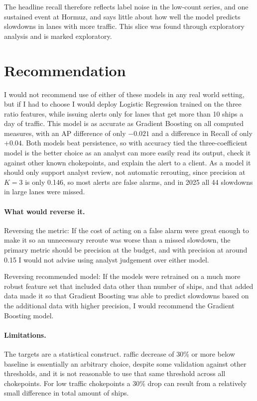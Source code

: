 \documentclass[11pt]{article}
\begin{document}
The headline recall therefore reflects label noise in the low-count series, and one sustained event at Hormuz, and says little about how well the model predicts slowdowns in lanes with more traffic. This slice was found through exploratory analysis and is marked exploratory. 
\section{Recommendation}  %
I would not recommend use of either of these models in any real world setting, but if I had to choose I would deploy Logistic Regression trained on the three ratio features, while issuing alerts only for lanes that get more than 10 ships a day of traffic. This model is as accurate as Gradient Boosting on all computed measures, with an AP difference of only $-0.021$ and a difference in Recall of only $+0.04$. Both models beat persistence, so with accuracy tied the three-coefficient model is the better choice as an analyst can more easily read its output, check it against other known chokepoints, and explain the alert to a client. As a model it should only support analyst review, not automatic rerouting, since precision at $K=3$ is only 0.146, so most alerts are false alarms, and in 2025 all 44 slowdowns in large lanes were missed. 
\paragraph{What would reverse it.}


Reversing the metric: If the cost of acting on a false alarm were great enough to make it so an unnecessary reroute was worse than a missed slowdown, the primary metric should be precision at the budget, and with precision at around 0.15 I would not advise using analyst judgement over either model. 

Reversing recommended model: If the models were retrained on a much more robust feature set that included data other than number of ships, and that added data made it so that Gradient Boosting was able to predict slowdowns based on the additional data with higher precision, I would recommend the Gradient Boosting model. 

\paragraph{Limitations.}
The targets are a statistical construct. raffic decrease of 30\% or more below baseline is essentially an arbitrary choice, despite some validation against other thresholds, and it is not reasonable to use that same threshold across all chokepoints. For low traffic chokepoints a 30\% drop can result from a relatively small difference in total amount of ships. 
\end{document}
